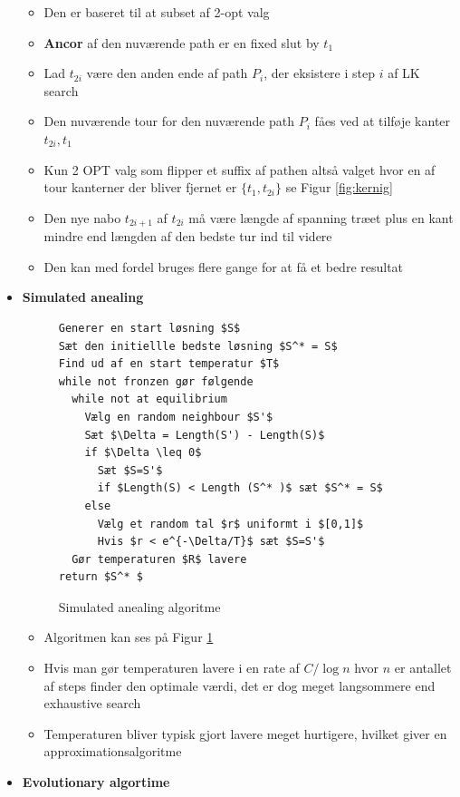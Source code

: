 \begin{itemize}
\begin{itemize}
    \item Den er baseret til at subset af 2-opt valg
    \item \textbf{Ancor} af den nuværende path er en fixed slut by $t_1$
    \item Lad $t_{2i}$ være den anden ende af path $P_i$, der eksistere i step $i$ af LK search
    \item Den nuværende tour for den nuværende path $P_i$ fåes ved at tilføje kanter $t_{2i}, t_1$ 
    \item Kun 2 OPT valg som flipper et suffix af pathen altså valget hvor en af tour kanterner der bliver fjernet er $\{t_1, t_{2i}\}$ se Figur \ref{fig:kernig}
    \item Den nye nabo $t_{2i+1}$ af $t_{2i}$ må være længde af spanning træet plus en kant mindre end længden af den bedste tur ind til videre
    \item Den kan med fordel bruges flere gange for at få et bedre resultat
  \end{itemize}
  \item \textbf{Simulated anealing} 
\begin{figure}[ht]
  \centering
\begin{lstlisting}  
Generer en start løsning $S$
Sæt den initiellle bedste løsning $S^* = S$ 
Find ud af en start temperatur $T$
while not fronzen gør følgende 
  while not at equilibrium
    Vælg en random neighbour $S'$
    Sæt $\Delta = Length(S') - Length(S)$
    if $\Delta \leq 0$
      Sæt $S=S'$
      if $Length(S) < Length (S^* )$ sæt $S^* = S$  
    else 
      Vælg et random tal $r$ uniformt i $[0,1]$
      Hvis $r < e^{-\Delta/T}$ sæt $S=S'$
  Gør temperaturen $R$ lavere
return $S^* $
\end{lstlisting}
  \caption{Simulated anealing algoritme\label{fig:simulated-anealing}}
\end{figure}
  \begin{itemize}
  	\item Algoritmen kan ses på Figur \ref{fig:simulated-anealing}
    \item Hvis man gør temperaturen lavere i en rate af $C/\log n$ hvor $n$ er antallet af steps finder den optimale værdi, det er dog meget langsommere end exhaustive search 
    \item Temperaturen bliver typisk gjort lavere meget hurtigere, hvilket giver en approximationsalgoritme
  \end{itemize}
  \item \textbf{Evolutionary algortime} 
\begin{figure}[ht]

\end{figure}
\end{itemize}
